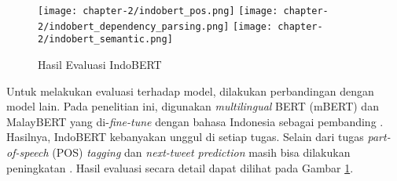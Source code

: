 \begin{figure}[ht]
    \centering
    \texttt{[image: chapter-2/indobert\_pos.png]}
    \texttt{[image: chapter-2/indobert\_dependency\_parsing.png]}
    \texttt{[image: chapter-2/indobert\_semantic.png]}
    \caption{Hasil Evaluasi IndoBERT \parencite{indolem}}
    \label{fig:indobert_evaluation}
\end{figure}

Untuk melakukan evaluasi terhadap model, dilakukan perbandingan dengan model lain. Pada penelitian ini, digunakan \textit{multilingual} BERT (mBERT) dan MalayBERT yang di-\textit{fine-tune} dengan bahasa Indonesia sebagai pembanding \parencite{indolem}. Hasilnya, IndoBERT kebanyakan unggul di setiap tugas. Selain dari tugas \textit{part-of-speech} (POS) \textit{tagging} dan \textit{next-tweet prediction} masih bisa dilakukan peningkatan \parencite{indolem}. Hasil evaluasi secara detail dapat dilihat pada Gambar \ref{fig:indobert_evaluation}.
